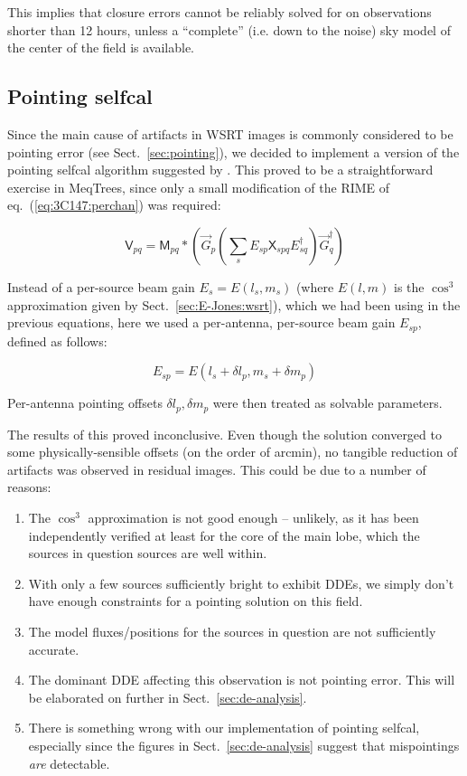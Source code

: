 \documentclass[]{aa}
\newcommand{\jones}[2]{\vec {#1}_{#2}}
\newcommand{\jonesT}[2]{\vec {#1}^\dagger_{#2}}
\newcommand{\coh}[2]{\mathsf{{#1}}_{{#2}}}
\begin{document}
This implies that closure errors cannot be reliably solved for on observations shorter than 12 hours, unless a ``complete'' (i.e. down to the noise) sky model of the center of the field is available.

\subsection{Pointing selfcal\label{sec:3C147:pointing}}

Since the main cause of artifacts in WSRT images is commonly considered to be pointing error (see Sect.~\ref{sec:pointing}), we decided to implement a version of the pointing selfcal algorithm suggested by \citet{SB:pointing}. This proved to be a straightforward exercise in MeqTrees, since only a small modification of the RIME of eq.~(\ref{eq:3C147:perchan}) was required: 

\begin{equation}\label{eq:3C147:pointing}
\coh{V}{pq} = \coh{M}{pq} \ast \left ( \jones{G}{p} \left( \sum_s E_{sp} \coh{X}{spq} E^{\dagger}_{sq} \right) \jonesT{G}{q} \right )
\end{equation}

Instead of a per-source beam gain $E_s=E(l_s,m_s)$ (where $E(l,m)$ is the $\cos^3$ approximation given by Sect.~\ref{sec:E-Jones:wsrt}), which we had been using in the previous equations, here we used a per-antenna, per-source beam gain $E_{sp}$, defined as follows:

\begin{equation}\label{eq:3C147:offset-beam}
E_{sp} = E(l_s+\delta l_p,m_s+\delta m_p)
\end{equation}

Per-antenna pointing offsets $\delta l_p,\delta m_p$ were then treated as solvable parameters. 

The results of this proved inconclusive. Even though the solution converged to some physically-sensible offsets (on the order of arcmin), no tangible reduction of artifacts was observed in residual images. This could be due to a number of reasons:

\begin{enumerate}
\item The $\cos^3$ approximation is not good enough -- unlikely, as it has been independently verified at least for the core of the main lobe, which the sources in question sources are well within.
\item With only a few sources sufficiently bright to exhibit DDEs, we simply don't have enough constraints for a pointing solution on this field.
\item The model fluxes/positions for the sources in question are not sufficiently accurate.
\item The dominant DDE affecting this observation is not pointing error. This will be elaborated on further in Sect.~\ref{sec:de-analysis}. 
\item There is something wrong with our implementation of pointing selfcal, especially since the figures in Sect.~\ref{sec:de-analysis} suggest that mispointings \emph{are} detectable.
\end{enumerate}
\end{document}

